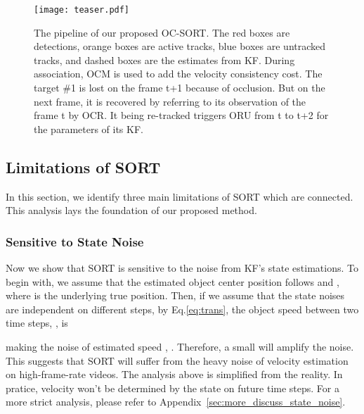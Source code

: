 \documentclass[10pt,twocolumn,letterpaper]{article}
\begin{document}
\begin{figure*}[t]
\setlength{\abovecaptionskip}{0.1cm}
    \centering
    \texttt{[image: teaser.pdf]}
    \caption{The pipeline of our proposed OC-SORT. The {\color{red} red boxes} are detections, {\color{orange} orange boxes} are active tracks, {\color{bleudefrance} blue boxes} are untracked tracks, and dashed boxes are the estimates from KF. During association, OCM is used to add the velocity consistency cost. The target \#1 is lost on the frame t+1 because of occlusion. But on the next frame, it is recovered by referring to its observation of the frame t by OCR. It being re-tracked triggers ORU from t to t+2 for the parameters of its KF. }
    \label{fig:pipeline}
    \vspace{-0.3cm}
\end{figure*}

\subsection{Limitations of SORT}
\label{sec:rethink}
In this section, we identify three main limitations of SORT which are connected. This analysis lays the foundation of our proposed method.

\vspace{-0.2cm}
\subsubsection{Sensitive to State Noise}
\label{sec:noise}
Now we show that SORT is sensitive to the noise from KF's state estimations. To begin with, we assume that the estimated object center position follows
 and , where  is the underlying true position.
Then, if we assume that the state noises are independent on different steps, by Eq.\ref{eq:trans}, the object speed between two time steps, , is

making the noise of estimated speed , . Therefore, a small  will amplify the noise. 
This suggests that SORT will suffer from the heavy noise of velocity estimation on high-frame-rate videos. 
The analysis above is simplified from the reality. 
In pratice, velocity won't be determined by the state on future time steps. For a more strict analysis, please refer to 
Appendix~\ref{sec:more_discuss_state_noise}.
\end{document}
